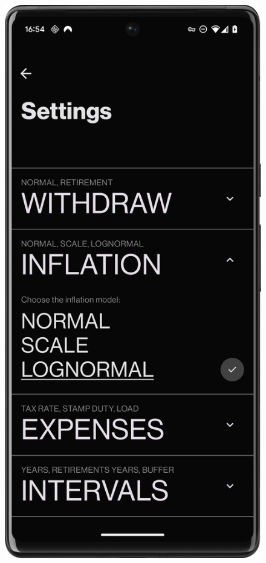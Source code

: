 \begin{figure}[H]
\begin{minipage}{0.24\textwidth}
        \label{fig:settings_screen}
    \end{minipage}
    \hfill
    \begin{minipage}{0.24\textwidth}
        \centering
        \includegraphics[width=\textwidth]{foto/inflation_card}

\end{minipage}
\end{figure}
